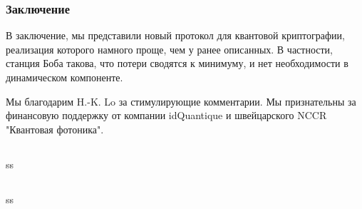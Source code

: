 \subsubsection{Заключение}

В заключение, мы представили новый протокол для квантовой криптографии, реализация которого намного проще, чем у ранее описанных. В частности, станция Боба такова, что потери сводятся к минимуму, и нет необходимости в динамическом компоненте.

Мы благодарим H.-K. Lo за стимулирующие комментарии. Мы признательны за финансовую поддержку от компании idQuantique и швейцарского NCCR "Квантовая фотоника".

\subsection{\review}
ss
\subsection{\dic}
ss